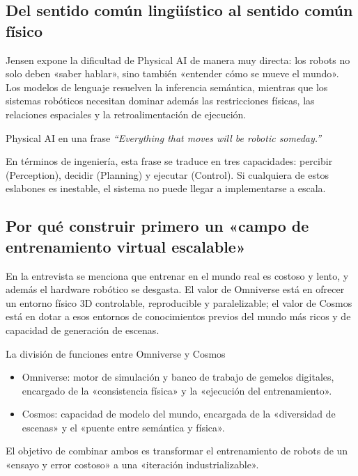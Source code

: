 \documentclass[a4paper]{article}
\begin{document}
\subsection{Del sentido común lingüístico al sentido común físico}

Jensen expone la dificultad de Physical AI de manera muy directa: los robots no solo deben «saber hablar», sino también «entender cómo se mueve el mundo». Los modelos de lenguaje resuelven la inferencia semántica, mientras que los sistemas robóticos necesitan dominar además las restricciones físicas, las relaciones espaciales y la retroalimentación de ejecución.

\begin{importantbox}{Physical AI en una frase}
\textit{``Everything that moves will be robotic someday.''}

En términos de ingeniería, esta frase se traduce en tres capacidades: percibir (Perception), decidir (Planning) y ejecutar (Control). Si cualquiera de estos eslabones es inestable, el sistema no puede llegar a implementarse a escala.
\end{importantbox}

\subsection{Por qué construir primero un «campo de entrenamiento virtual escalable»}

En la entrevista se menciona que entrenar en el mundo real es costoso y lento, y además el hardware robótico se desgasta. El valor de Omniverse está en ofrecer un entorno físico 3D controlable, reproducible y paralelizable; el valor de Cosmos está en dotar a esos entornos de conocimientos previos del mundo más ricos y de capacidad de generación de escenas.

\begin{knowledgebox}{La división de funciones entre Omniverse y Cosmos}
\begin{itemize}
    \item Omniverse: motor de simulación y banco de trabajo de gemelos digitales, encargado de la «consistencia física» y la «ejecución del entrenamiento».
    \item Cosmos: capacidad de modelo del mundo, encargada de la «diversidad de escenas» y el «puente entre semántica y física».
\end{itemize}
El objetivo de combinar ambos es transformar el entrenamiento de robots de un «ensayo y error costoso» a una «iteración industrializable».
\end{knowledgebox}
\end{document}
